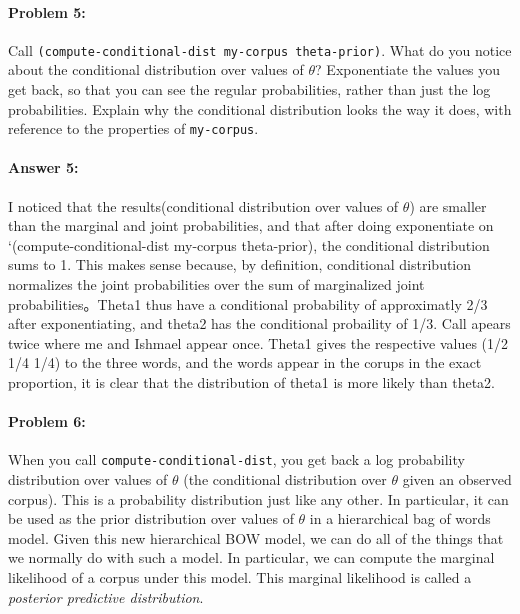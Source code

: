 \documentclass[10pt]{article}
\begin{document}
\paragraph{Problem 5:}
 
Call \texttt{(compute-conditional-dist my-corpus theta-prior)}. What
do you notice about the conditional distribution over values of
$\theta$?  Exponentiate the values you get back, so that you can see
the regular probabilities, rather than just the log
probabilities. Explain why the conditional distribution looks the way
it does, with reference to the properties of \texttt{my-corpus}.

\paragraph{Answer 5:} I noticed that the results(conditional distribution over values of $\theta$) are smaller than the marginal and joint probabilities, and that after doing exponentiate on `(compute-conditional-dist my-corpus theta-prior), the conditional distribution sums to 1. This makes sense because, by definition, conditional distribution normalizes the joint probabilities over the sum of marginalized joint probabilities。Theta1 thus have a conditional probability of approximatly 2/3 after exponentiating, and theta2 has the conditional probaility of 1/3. Call apears twice where me and Ishmael appear once. Theta1 gives the respective values (1/2 1/4 1/4) to the three words, and the words appear in the corups in the exact proportion, it is clear that the distribution of theta1 is more likely than theta2.       

\noindent\hrulefill %

\paragraph{Problem 6:}
 
When you call \texttt{compute-conditional-dist}, you get back a
log probability distribution over values of $\theta$ (the conditional
distribution over $\theta$ given an observed corpus). This is a
probability distribution just like any other. In particular, it can be
used as the prior distribution over values of $\theta$ in a
hierarchical bag of words model. Given this new hierarchical BOW
model, we can do all of the things that we normally do with such a
model. In particular, we can compute the marginal likelihood of a
corpus under this model. This marginal likelihood is called a
\emph{posterior predictive distribution}.
\\
\end{document}
